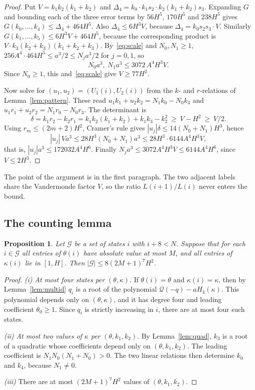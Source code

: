 \documentclass[11pt]{amsart}
\newtheorem{proposition}[theorem]{Proposition}
\theoremstyle{definition}
\theoremstyle{remark}
\begin{document}
\begin{proof}
Put $V=k_1k_2(k_1+k_2)$ and $\Delta_4=k_0\cdot k_1s_2\cdot k_2(k_1+k_2)s_3$. Expanding $G$ and
bounding each of the three error terms by $56H^5$, $170H^5$ and $238H^5$ gives
$G(k_0,\dots,k_4)\le\Delta_4+464H^5$. Also $\Delta_4\le 6H^3V$, because
$\Delta_4=k_0s_2s_3\cdot V$. Similarly $G(k_1,\dots,k_5)\le 6H^3V+464H^5$, because the
corresponding product is $V\cdot k_3(k_2+k_3)(k_1+k_2+k_3)$. By~\eqref{eq:scale} and $N_0,N_1\ge1$,
$256A^4\cdot464H^5\le a^3/2\le N_ja^3/2$ for $j=0,1$, so
\[
N_0a^3,\ N_1a^3\le 3072\,A^4H^3V .
\]
Since $N_0\ge1$, this and~\eqref{eq:scale} give $V\ge 77H^2$.

Now solve for $(u_1,u_2)=(U_1(i),U_2(i))$ from the $k$- and $r$-relations of
Lemma~\ref{lem:pattern}. These read $u_1k_1+u_2k_2=N_1k_0-N_0k_3$ and
$u_1r_1+u_2r_2=N_1r_0-N_0r_3$. The determinant is
\[
\delta=k_1r_2-k_2r_1=k_1k_2(k_1+k_2)+k_1k_3-k_2^2\ \ge\ V-H^2\ \ge\ V/2 .
\]
Using $r_m\le (2m+2)H^2$, Cramer's rule gives $|u_j|\delta\le 14(N_0+N_1)H^3$, hence
\[
|u_j|\,V a^3\le 28H^3(N_0+N_1)a^3\le 28H^3\cdot 6144A^4H^3V ,
\]
that is, $|u_j|a^3\le172032A^4H^6$. Finally $N_ja^3\le3072A^4H^3V\le6144A^4H^6$, since
$V\le2H^3$.
\end{proof}

The point of the argument is in the first paragraph. The two adjacent labels share the
Vandermonde factor $V$, so the ratio $L(i+1)/L(i)$ never enters the bound.

\subsection{The counting lemma}

\begin{proposition}\label{prop:pcount}
Let $\mathcal G$ be a set of states $i$ with $i+8<N$. Suppose that for each $i\in\mathcal G$
all entries of $\theta(i)$ have absolute value at most $M$, and all entries of $\kappa(i)$ lie
in $[1,H]$. Then $|\mathcal G|\le 8(2M+1)^7H^2$.
\end{proposition}

\begin{proof}
\emph{(i) At most four states per $(\theta,\kappa)$.} If $\theta(i)=\theta$ and
$\kappa(i)=\kappa$, then by Lemma~\ref{lem:multid} $q_i$ is a root of the polynomial
$\mathcal Q(-q)-aH_4(\kappa)$. This polynomial depends only on $(\theta,\kappa)$, and it has
degree four and leading coefficient $\theta_0\ge1$. Since $q_i$ is strictly increasing in $i$,
there are at most four such states.

\emph{(ii) At most two values of $\kappa$ per $(\theta,k_1,k_2)$.} By Lemma~\ref{lem:quad},
$k_3$ is a root of a quadratic whose coefficients depend only on $(\theta,k_1,k_2)$. The
leading coefficient is $N_1N_0(N_1+N_0)>0$. The two linear relations then determine $k_0$ and
$k_4$, because $N_1\ne0$.

\emph{(iii)} There are at most $(2M+1)^7H^2$ values of $(\theta,k_1,k_2)$.
\end{proof}
\end{document}
